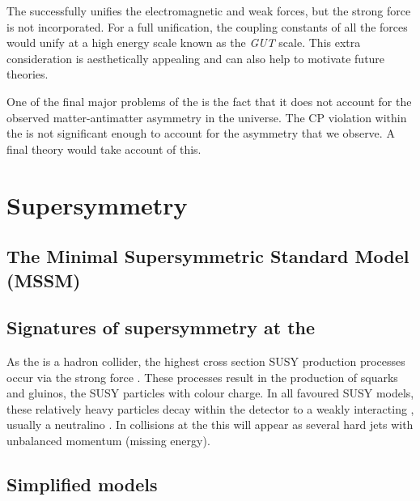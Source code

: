 The \SM successfully unifies the electromagnetic and weak forces, but
the strong force is not incorporated. For a full unification, the
coupling constants of all the \SM forces would unify at a high energy
scale known as the \emph{GUT} scale. This extra consideration is
aesthetically appealing and can also help to motivate future \BSM
theories.

One of the final major problems of the \SM is the fact that it does
not account for the observed matter-antimatter asymmetry in the
universe. The \ac{CP} violation within the \SM is not significant
enough to account for the asymmetry that we observe. A final \BSM
theory would take account of this.

\section{Supersymmetry}
\label{sec:susy}




\subsection{The Minimal Supersymmetric Standard Model (MSSM)}

\subsection{Signatures of supersymmetry at the \LHC}

As the \LHC is a hadron collider, the highest cross section SUSY
production processes occur via the strong force
\cite{Martin:1997ns}
\cite{SUSYxsections_NewAspectsof_pp_collisions}. These processes
result in the production of squarks and gluinos, the SUSY particles
with colour charge. In all favoured SUSY models, these relatively
heavy particles decay within the detector to a weakly interacting \LSP,
usually a neutralino \cite{Farrar:1978xj}. In
collisions at the \LHC this will appear as several hard jets with
unbalanced momentum (missing energy). 

\subsection{Simplified models}

